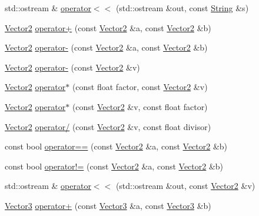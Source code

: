 \begin{DoxyCompactItemize}
\item 
std\+::ostream \& \hyperlink{namespaceprism_a0a166bbf645cc854542cc0fc50324670}{operator$<$$<$} (std\+::ostream \&out, const \hyperlink{classprism_1_1_string}{String} \&s)
\item 
\hyperlink{classprism_1_1_vector2}{Vector2} \hyperlink{namespaceprism_ae482804c32b466401a9ecdf26bc1e6de}{operator+} (const \hyperlink{classprism_1_1_vector2}{Vector2} \&a, const \hyperlink{classprism_1_1_vector2}{Vector2} \&b)
\item 
\hyperlink{classprism_1_1_vector2}{Vector2} \hyperlink{namespaceprism_a86359a88dc5245847de48575a1f969e8}{operator-\/} (const \hyperlink{classprism_1_1_vector2}{Vector2} \&a, const \hyperlink{classprism_1_1_vector2}{Vector2} \&b)
\item 
\hyperlink{classprism_1_1_vector2}{Vector2} \hyperlink{namespaceprism_a124f1081b3a9bbc441dac9927f8a0fc5}{operator-\/} (const \hyperlink{classprism_1_1_vector2}{Vector2} \&v)
\item 
\hyperlink{classprism_1_1_vector2}{Vector2} \hyperlink{namespaceprism_a6528ec4496096e8ccde186bb01fbeed3}{operator$\ast$} (const float factor, const \hyperlink{classprism_1_1_vector2}{Vector2} \&v)
\item 
\hyperlink{classprism_1_1_vector2}{Vector2} \hyperlink{namespaceprism_a1de3bc1dbc3fd33f26d580bce3520854}{operator$\ast$} (const \hyperlink{classprism_1_1_vector2}{Vector2} \&v, const float factor)
\item 
\hyperlink{classprism_1_1_vector2}{Vector2} \hyperlink{namespaceprism_aea1ab02785c9d4d5ea560face252b75e}{operator/} (const \hyperlink{classprism_1_1_vector2}{Vector2} \&v, const float divisor)
\item 
const bool \hyperlink{namespaceprism_a311fc983ec89876189643e840d781974}{operator==} (const \hyperlink{classprism_1_1_vector2}{Vector2} \&a, const \hyperlink{classprism_1_1_vector2}{Vector2} \&b)
\item 
const bool \hyperlink{namespaceprism_a7e9d0b027a9e7d9e313affe5af91dabc}{operator!=} (const \hyperlink{classprism_1_1_vector2}{Vector2} \&a, const \hyperlink{classprism_1_1_vector2}{Vector2} \&b)
\item 
std\+::ostream \& \hyperlink{namespaceprism_a4616180b97f4288a3b3e28304efee020}{operator$<$$<$} (std\+::ostream \&out, const \hyperlink{classprism_1_1_vector2}{Vector2} \&v)
\item 
\hyperlink{classprism_1_1_vector3}{Vector3} \hyperlink{namespaceprism_a7ac90b31f235390d6feb818e3f88ecf0}{operator+} (const \hyperlink{classprism_1_1_vector3}{Vector3} \&a, const \hyperlink{classprism_1_1_vector3}{Vector3} \&b)

\end{DoxyCompactItemize}
